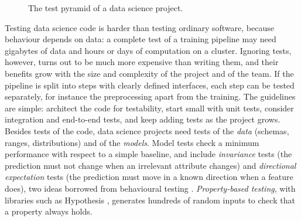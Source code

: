 \begin{figure}[htbp]
\centering
{}
\caption{The test pyramid of a data science project.}
\label{fig:pyramid}
\end{figure}

Testing data science code is harder than testing ordinary software, because behaviour depends on data:
a complete test of a training pipeline may need gigabytes of data and hours or days of computation on a
cluster. Ignoring tests, however, turns out to be much more expensive than writing them, and their
benefits grow with the size and complexity of the project and of the team. If the pipeline is split into
steps with clearly defined interfaces, each step can be tested separately, for instance the preprocessing
apart from the training. The guidelines are simple: architect the code for testability, start small with
unit tests, consider integration and end-to-end tests, and keep adding tests as the project grows. Besides tests of the code, data
science projects need tests of the \emph{data} (schemas, ranges, distributions) and of the \emph{models}. Model tests check
a minimum performance with respect to a simple baseline, and include \emph{invariance} tests (the prediction must not
change when an irrelevant attribute changes) and \emph{directional expectation} tests (the prediction must
move in a known direction when a feature does), two ideas borrowed from behavioural testing
\citep{ribeiro2020beyond}. \emph{Property-based testing}, with libraries such as Hypothesis
\citep{maciver2019hypothesis}, generates hundreds of random inputs to check that a property always holds.

